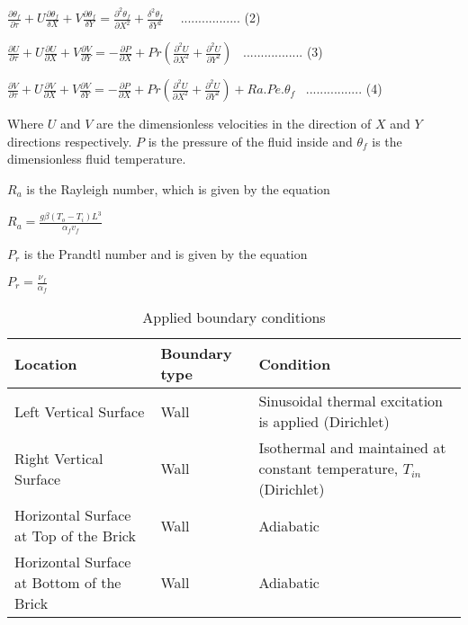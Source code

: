 \documentclass{article}
\begin{document}
\begin{center}
$ \frac{\partial \theta_f}{\partial \tau} + U\frac{\partial \theta_f}{\delta X} + V\frac{\partial \theta_f}{\delta Y} = \frac{\partial^2 \theta_f}{\partial X^2} + \frac{\delta^2 \theta_f}{\delta Y^2}$  \qquad\qquad\quad \quad\quad  \quad\quad  \quad \quad  \ \ ................. (2)\\
\end{center}
\begin{center}
$ \frac{\partial U}{\partial \tau} + U\frac{\partial U}{\partial X} + V\frac{\partial V}{\partial Y} = -\frac{\partial P}{\partial X} + Pr\left(\frac{\partial^2 U}{\partial X^2} + \frac{\partial^2 U}{\partial Y^2}\right) $  \quad\quad\quad \quad   \quad  \quad \ ................. (3)\\
\end{center}
\begin{center}

$ \frac{\partial V}{\partial \tau} + U\frac{\partial V}{\partial X} + V\frac{\partial V}{\delta Y} = -\frac{\partial P}{\partial X} + Pr\left(\frac{\partial^2 U}{\partial X^2} + \frac{\partial^2 U}{\partial Y^2}\right) + Ra.Pe.\theta_f$       \quad \ ................ (4) \\
\end{center}


\begin{multicols}{2}
Where $U$ and $V$ are the dimensionless velocities in the direction of $X$ and $Y$ directions respectively. $P$ is the pressure of the fluid inside and $\theta_f$ is the dimensionless fluid temperature.

$R_a$ is the Rayleigh number,  which is given by the equation

 $R_a = \frac{g\beta(T_o - T_i)L^3}{\alpha_f v_f}$

$P_r$ is the Prandtl number and is given by the equation

 $ P_r = \frac{\nu_f}{\alpha_f}$  

\end{multicols}

\begin{table}[H]
\begin{center}
\caption{Applied boundary conditions } 
\begin{tabular}{p{5.5cm}p{3cm}p{5.5cm}}
\hline
 Location & Boundary type & Condition \\
\hline
Left Vertical Surface &Wall & Sinusoidal thermal excitation is applied (Dirichlet) \\
\hline 
Right Vertical Surface & Wall &Isothermal and maintained at constant temperature, $T_{in}$ (Dirichlet) \\
\hline 
Horizontal Surface at Top of the Brick & Wall & Adiabatic \\
\hline
Horizontal Surface at Bottom of the Brick & Wall & Adiabatic \\
\hline
\end{tabular}
\end{center}
\end{table}
\end{document}

